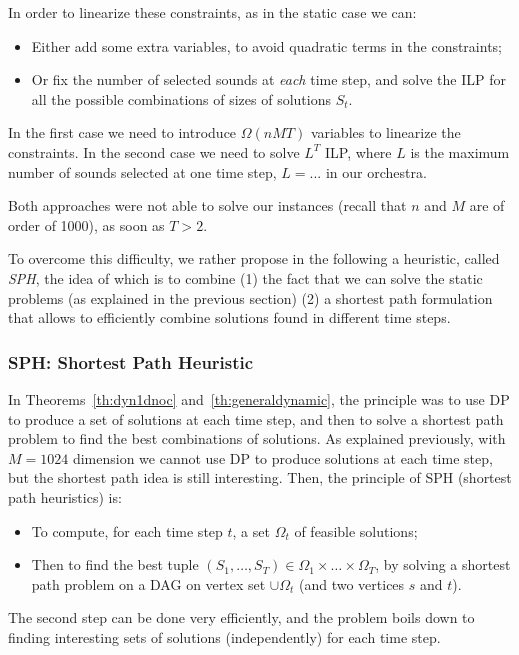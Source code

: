 \documentclass[a4paper]{book}
\begin{document}
In order to linearize these constraints, as in the static case we can:
\begin{itemize}
    \item Either add some extra variables, to avoid quadratic terms in the constraints;
    \item Or fix the number of selected sounds at {\it each} time step, and solve the ILP for all the possible combinations of sizes of solutions $S_t$.
\end{itemize}
In the first case we need to introduce $\Omega(nMT)$ variables to linearize the constraints. In the second case we need to solve $L^T$ ILP, where $L$ is the maximum number of sounds selected at one time step, $L=...$ in our orchestra.

Both approaches were not able to solve our instances (recall that $n$ and $M$ are of order of 1000), as soon as $T>2$. 

To overcome this difficulty, we rather propose in the following a heuristic, called {\it SPH}, the idea of which is to combine (1) the fact that we can solve the static problems (as explained in the previous section) (2) a shortest path formulation that allows to efficiently combine  solutions found in different time steps.  


\subsubsection{SPH: Shortest Path Heuristic}

In Theorems~\ref{th:dyn1dnoc} and~\ref{th:generaldynamic}, the principle was to use DP to produce a set of solutions at each time step, and then to solve a shortest path problem to find the best combinations of solutions. As explained previously, with $M=1024$ dimension we cannot use DP to produce solutions at each time step, but the shortest path idea is still interesting. Then, the principle of SPH (shortest path heuristics) is:
\begin{itemize}
    \item To compute, for each time step $t$, a set $\Omega_t$ of feasible solutions;
    \item Then to find the best tuple $(S_1,\dots,S_T)\in \Omega_1\times \dots \times \Omega_T$, by solving a shortest path problem on a DAG on vertex set $\cup \Omega_t$ (and two vertices $s$ and $t$).
\end{itemize}

The second step can be done very efficiently, and the problem boils down to finding interesting sets of solutions (independently) for each time step. 
\end{document}
